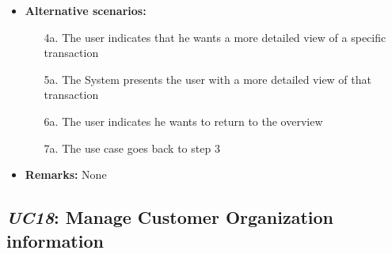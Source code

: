 \documentclass[a4paper,10pt]{article}
\begin{document}
\begin{itemize}
	\item \textbf{Alternative scenarios:} 
	\begin{enumerate}
		\item [4a.] The user indicates that he wants a more detailed view of a specific transaction
		\item [5a.] The System presents the user with a more detailed view of that transaction
		\item [6a.] The user indicates he wants to return to the overview
		\item [7a.] The use case goes back to step 3
	\end{enumerate}
	
	\item \textbf{Remarks:}
	None
\end{itemize}

\subsection{\emph{UC18}: Manage Customer Organization information}
\end{document}
